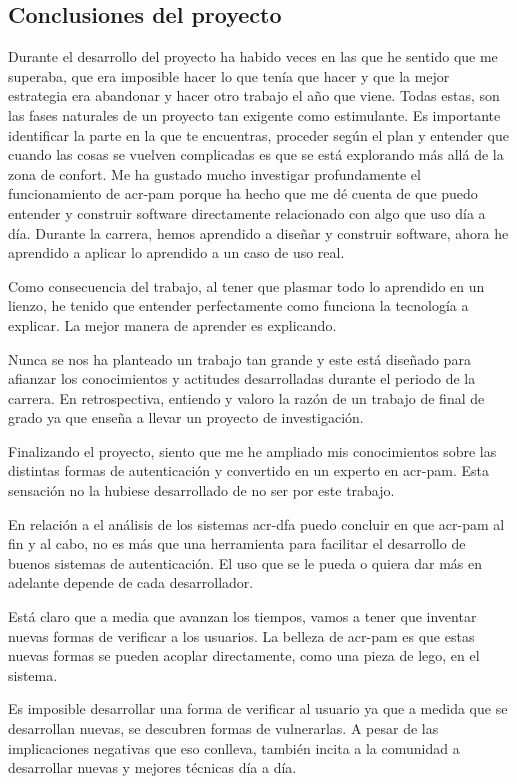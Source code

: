 \documentclass[twoside, titlepage, 12pt, a4paper]{article}
\begin{document}
{\subsection{Conclusiones del proyecto}
Durante el desarrollo del proyecto ha habido veces en las que he sentido que me superaba, que era imposible hacer lo que tenía que hacer y que la mejor estrategia era abandonar y hacer otro trabajo el año que viene. Todas estas, son las fases naturales de un proyecto tan exigente como estimulante. Es importante identificar la parte en la que te encuentras, proceder según el plan y entender que cuando las cosas se vuelven complicadas es que se está explorando más allá de la zona de confort.
Me ha gustado mucho investigar profundamente el funcionamiento de \gls{acr-pam} porque ha hecho que me dé cuenta de que puedo entender y construir software directamente relacionado con algo que uso día a día. Durante la carrera, hemos aprendido a diseñar y construir software, ahora he aprendido a aplicar lo aprendido a un caso de uso real.\par
Como consecuencia del trabajo, al tener que plasmar todo lo aprendido en un lienzo, he tenido que entender perfectamente como funciona la tecnología a explicar. La mejor manera de aprender es explicando.\par
Nunca se nos ha planteado un trabajo tan grande y este está diseñado para afianzar los conocimientos y actitudes desarrolladas durante el periodo de la carrera. En retrospectiva, entiendo y valoro la razón de un trabajo de final de grado ya que enseña a llevar un proyecto de investigación. \par
Finalizando el proyecto, siento que me he ampliado mis conocimientos sobre las distintas formas de autenticación y convertido en un experto en \gls{acr-pam}. Esta sensación no la hubiese desarrollado de no ser por este trabajo.\par
En relación a el análisis de los sistemas \gls{acr-dfa} puedo concluir en que \gls{acr-pam} al fin y al cabo, no es más que una herramienta para facilitar el desarrollo de buenos sistemas de autenticación. El uso que se le pueda o quiera dar más en adelante depende de cada desarrollador. \par
Está claro que a media que avanzan los tiempos, vamos a tener que inventar nuevas formas de verificar a los usuarios. La belleza de \gls{acr-pam} es que estas nuevas formas se pueden acoplar directamente, como una pieza de lego, en el sistema.\par
Es imposible desarrollar una forma de verificar al usuario ya que a medida que se desarrollan nuevas, se descubren formas de vulnerarlas. A pesar de las implicaciones negativas que eso conlleva, también incita a la comunidad a desarrollar nuevas y mejores técnicas día a día.
}
\end{document}
